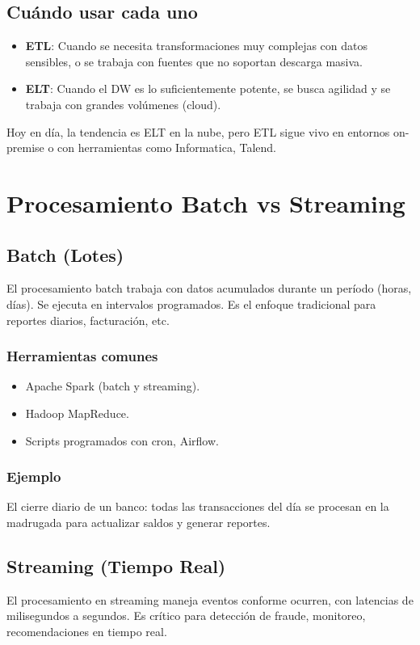 \documentclass[12pt,a4paper,openany,oneside]{book}
\begin{document}
\section{Cuándo usar cada uno}
\begin{itemize}
    \item \textbf{ETL}: Cuando se necesita transformaciones muy complejas con datos sensibles, o se trabaja con fuentes que no soportan descarga masiva.
    \item \textbf{ELT}: Cuando el DW es lo suficientemente potente, se busca agilidad y se trabaja con grandes volúmenes (cloud).
\end{itemize}
Hoy en día, la tendencia es ELT en la nube, pero ETL sigue vivo en entornos on-premise o con herramientas como Informatica, Talend.

\chapter{Procesamiento Batch vs Streaming}
\section{Batch (Lotes)}
El procesamiento batch trabaja con datos acumulados durante un período (horas, días). Se ejecuta en intervalos programados. Es el enfoque tradicional para reportes diarios, facturación, etc.

\subsection{Herramientas comunes}
\begin{itemize}
    \item Apache Spark (batch y streaming).
    \item Hadoop MapReduce.
    \item Scripts programados con cron, Airflow.
\end{itemize}
\subsection{Ejemplo}
El cierre diario de un banco: todas las transacciones del día se procesan en la madrugada para actualizar saldos y generar reportes.

\section{Streaming (Tiempo Real)}
El procesamiento en streaming maneja eventos conforme ocurren, con latencias de milisegundos a segundos. Es crítico para detección de fraude, monitoreo, recomendaciones en tiempo real.
\end{document}
